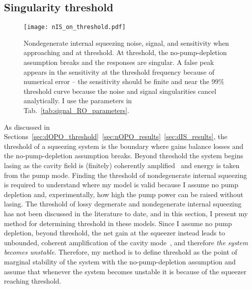 \subsection{Singularity threshold}
\label{sec:singularity_threshold}


\begin{figure}
    \centering
    \texttt{[image: nIS\_on\_threshold.pdf]}
    \caption{Nondegenerate internal squeezing noise, signal, and sensitivity when approaching and at threshold. At threshold, the no-pump-depletion assumption breaks and the responses are singular. A false peak appears in the sensitivity at the threshold frequency because of numerical error -- the sensitivity should be finite and near the $99\%$ threshold curve because the noise and signal singularities cancel analytically. I use the parameters in Tab.~\ref{tab:signal_RO_parameters}. %
    }
    \label{fig:nIS_on_threshold}
\end{figure}

As discussed in Sections~\ref{sec:dOPO_threshold}~\ref{sec:nOPO_results}~\ref{sec:dIS_results}, the threshold of a squeezing system is the boundary where gains balance losses and the no-pump-depletion assumption breaks. Beyond threshold the system begins lasing as the cavity field is (finitely) coherently amplified~\cite{} and energy is taken from the pump mode.
Finding the threshold of nondegenerate internal squeezing is required to understand where my model is valid because I assume no pump depletion and, experimentally, how high the pump power can be raised without lasing.
The threshold of lossy degenerate and nondegenerate internal squeezing has not been discussed in the literature to date, and in this section, I present my method for determining threshold in these models. %
Since I assume no pump depletion, beyond threshold, the net gain at the squeezer instead leads to unbounded, coherent amplification of the cavity mode~\cite{lasingMaterial}, and therefore \emph{the system becomes unstable}. Therefore, my method is to define threshold as the point of marginal stability of the system with the no-pump-depletion assumption and assume that whenever the system becomes unstable it is because of the squeezer reaching threshold.

